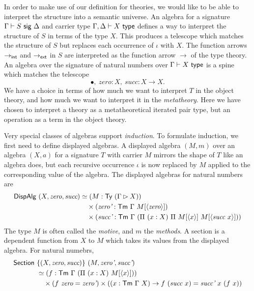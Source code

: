 In order to make use of our definition for theories, we would like to be able to
interpret the structure into a semantic universe. An algebra for a signature
$\Gamma \vdash S \ \textsf{sig}\  \Delta$ and carrier type $\Gamma, \Delta \vdash X \ \textsf{type}$
defines a way to interpret the structure of $S$ in terms of the type $X$. This
produces a telescope which matches the structure of $S$ but replaces each
occurrence of $\iota$ with $X$. The function arrows $\to_{\textsf{int}}$ and
$\to_{\textsf{ext}}$ in $S$ are interpreted as the function arrow $\to$
of the type theory.
An algebra over the signature of natural numbers over $\Gamma \vdash X \ \textsf{type}$ is a spine which
matches the telescope
\[
  \bullet,\ \textit{zero}: X,\ \textit{succ}: X \to X.
\]
We have a choice in terms of how much we want to interpret $T$ in the object theory,
and how much we want to interpret it in the \emph{metatheory}. Here we have chosen to interpret
a theory as a metatheoretical iterated pair type, but an operation as a term in the object theory.

Very special classes of algebras support \emph{induction}.
To formulate induction, we first need to define displayed algebras.
A displayed algebra $(M, m)$ over an algebra $(X, a)$ for a signature $T$ with
carrier $M$ mirrors the shape of $T$ like an algebra does, but each recursive
occurrence $\iota$ is now replaced by $M$ applied to the corresponding value of
the algebra. The displayed algebras for natural numbers are
\begin{align*}
	\mta{DispAlg}\ (X, \textit{zero}, \textit{succ}) & \simeq (M : \Ty\ (\Gamma \rhd X))                                                      \\
	                               & \quad \times (\textit{zero'} : \Tm\ \Gamma\ M[\Msub{\textit{zero}}])                                            \\
	                               & \quad \times (\textit{succ'} : \Tm\ \Gamma\ (\Pi\ (x : X)\ \Pi\ M[\Msub{x}]\ M[\Msub{\textit{succ}\ x}]))
\end{align*}
The type $M$ is often called the \emph{motive}, and $m$ the \emph{methods}.
A section is a dependent function from $X$ to $M$ which takes its values from
the displayed algebra. For natural numebrs,
\begin{align*}
	\mta{Section}\  & \{(X, \textit{zero}, \textit{succ})\}\ (M, \textit{zero'}, \textit{succ'})                                                                                           \\
	                & \simeq (f : \Tm\ \Gamma\ (\Pi\ (x : X)\ M[\Msub x]))                                                                                   \\
	                & \quad \times (f\ \textit{zero} = \textit{zero'}) \times ((x : \Tm\ \Gamma\ X) \to f\ (\textit{succ}\ x) = \textit{succ'}\ x\ (f\ x))
\end{align*}

